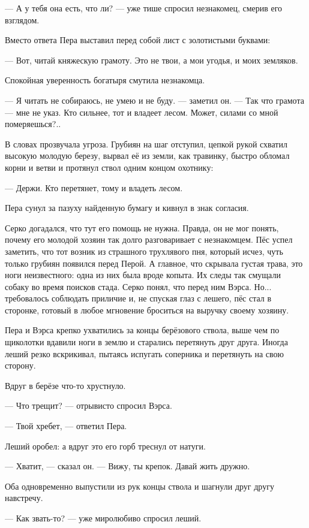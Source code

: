 \documentclass[12pt, a4paper, openany]{book}
\begin{document}
	— А у тебя она есть, что ли? — уже тише спросил незнакомец, смерив его взглядом.
	
	Вместо ответа Пера выставил перед собой лист с золотистыми буквами:
	
	— Вот, читай княжескую грамоту. Это не твои, а мои угодья, и моих земляков.
	
	Спокойная уверенность богатыря смутила незнакомца.
	
	— Я читать не собираюсь, не умею и не буду. — заметил он. — Так что грамота — мне не указ. Кто сильнее, тот и владеет лесом. Может, силами со мной померяешься?..
	
	В словах прозвучала угроза. Грубиян на шаг отступил, цепкой рукой схватил высокую молодую березу, вырвал её из земли, как травинку, быстро обломал корни и ветви и протянул ствол одним концом охотнику:
	
	— Держи. Кто перетянет, тому и владеть лесом.
	
	Пера сунул за пазуху найденную бумагу и кивнул в знак согласия.
	
	Серко догадался, что тут его помощь не нужна. Правда, он не мог понять, почему его молодой хозяин так долго разговаривает с незнакомцем. Пёс успел  заметить, что тот возник из страшного трухлявого пня, который исчез, чуть только грубиян появился перед Перой. А главное, что скрывала густая трава, это ноги неизвестного: одна из них была вроде копыта. Их следы так смущали собаку во время поисков стада. Серко понял, что перед ним Вэрса. Но... требовалось соблюдать приличие и, не спуская глаз с лешего, пёс стал в сторонке, готовый в любое мгновение броситься на выручку своему хозяину.
	
	Пера и Вэрса крепко ухватились за концы берёзового ствола, выше чем по щиколотки вдавили ноги в землю и старались перетянуть друг друга. Иногда леший резко вскрикивал, пытаясь испугать соперника и перетянуть на свою сторону.
	
	Вдруг в берёзе что-то хрустнуло.
	
	— Что трещит? — отрывисто спросил Вэрса.
	
	— Твой хребет, — ответил Пера.
	
	Леший оробел: а вдруг это его горб треснул от натуги.
	
	— Хватит, — сказал он. — Вижу, ты крепок. Давай жить дружно.
	
	Оба одновременно выпустили из рук концы ствола и шагнули друг другу навстречу.
	
	— Как звать-то? — уже миролюбиво спросил леший.
	
\end{document}
